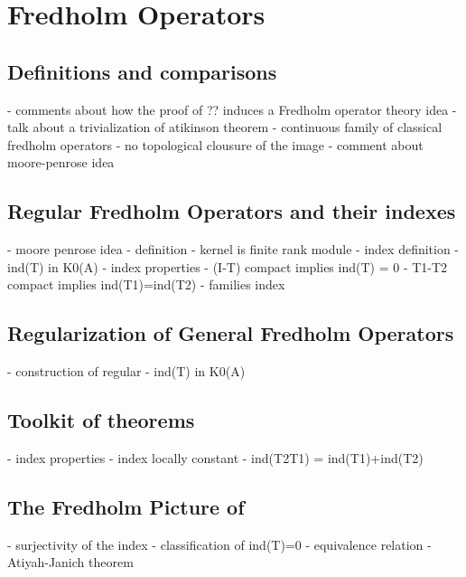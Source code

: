\chapter{Fredholm Operators}
\label{ch:fredholm operators}
\section{Definitions and comparisons}
- comments about how the proof of ?? induces a Fredholm operator theory idea
- talk about a trivialization of atikinson theorem
- continuous family of classical fredholm operators 
- no topological clousure of the image
- comment about moore-penrose idea

\section{Regular Fredholm Operators and their indexes}
- moore penrose idea
- definition
- kernel is finite rank module 
- index definition
- ind(T) in K0(A) 
- index properties
- (I-T) compact implies ind(T) = 0
- T1-T2 compact implies ind(T1)=ind(T2)
- families index

\section{Regularization of General Fredholm Operators}
- construction of regular
- ind(T) in K0(A)

\section{Toolkit of theorems}
- index properties
- index locally constant
- ind(T2T1) = ind(T1)+ind(T2)

\section[The Fredholm Picture of \texorpdfstring{\ensuremath{K_0}}{K0}]{The Fredholm Picture of \texorpdfstring{}{K0}}
- surjectivity of the index
- classification of ind(T)=0
- equivalence relation
- Atiyah-Janich theorem
